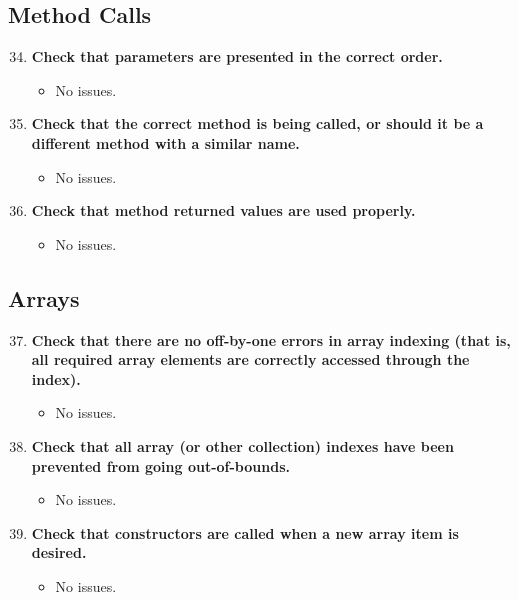 \documentclass{article}
\begin{document}
		\subsection{Method Calls}
			\begin{enumerate}
				\setcounter{enumi}{33}
				\item \textbf{Check that parameters are presented in the correct order.}
				\begin{itemize}
					\item No issues.
				\end{itemize}
				\item \textbf{Check that the correct method is being called, or should it be a different method with a similar name.}
				\begin{itemize}
					\item No issues.
				\end{itemize}
				\item \textbf{Check that method returned values are used properly.}
				\begin{itemize}
					\item No issues.
				\end{itemize}
			\end{enumerate}
		\subsection{Arrays}
			\begin{enumerate}
				\setcounter{enumi}{36}
				\item \textbf{Check that there are no off-by-one errors in array indexing (that is, all required array elements are correctly accessed through the index).}
				\begin{itemize}
					\item No issues.
				\end{itemize}
				\item \textbf{Check that all array (or other collection) indexes have been prevented from going out-of-bounds.}
				\begin{itemize}
					\item No issues.
				\end{itemize}
				\item \textbf{Check that constructors are called when a new array item is desired.}
				\begin{itemize}
					\item No issues.
				\end{itemize}
			\end{enumerate}
\end{document}
